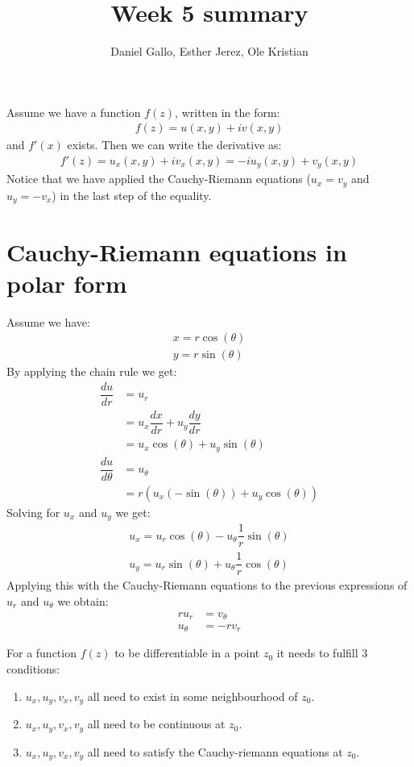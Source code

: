\documentclass{report}
\title{Week 5 summary}
\author{Daniel Gallo, Esther Jerez, Ole Kristian}
\begin{document}
    \maketitle
    \noindent
    Assume we have a function $f(z)$, written in the form:
    \begin{align*}
        f(z) = u(x,y) + iv(x,y)
    \end{align*}
    and $f'(x)$ exists. Then we can write the derivative as:
    \begin{align*}
        f'(z) = u_x(x,y) + iv_x(x,y) = -iu_y(x,y) + v_y(x,y)
    \end{align*}
    Notice that we have applied the Cauchy-Riemann equations ($u_x = v_y$ and $u_y = -v_x$) in the last step of the equality.
    
    \section*{Cauchy-Riemann equations in polar form}
    Assume we have:
    \begin{align*}
        x = r\cos(\theta) \\
        y = r\sin(\theta)
    \end{align*}
    By applying the chain rule we get:
    \begin{align*}
        \dfrac{du}{dr} &= u_r \\ &= u_x\dfrac{dx}{dr} + u_y\dfrac{dy}{dr} \\ &= u_x\cos(\theta)+u_y\sin(\theta) \\
        \dfrac{du}{d\theta} &= u_\theta \\ &= r(u_x(-\sin(\theta)) + u_y\cos(\theta))
    \end{align*}
    Solving for $u_x$ and $u_y$ we get:
    \begin{align*}
        u_x = u_r\cos(\theta) - u_\theta\dfrac{1}{r}\sin(\theta) \\
        u_y = u_r\sin(\theta) + u_\theta\dfrac{1}{r}\cos(\theta)
    \end{align*}
    Applying this with the Cauchy-Riemann equations to the previous expressions of $u_r$ and $u_\theta$ we obtain:
    \begin{align*}
        ru_r &= v_\theta \\ u_\theta &= -rv_r
    \end{align*}
    \begin{tcolorbox}[title=Theorem]
        For a function $f(z)$ to be differentiable in a point $z_0$ it needs to fulfill 3 conditions:
        \begin{enumerate}
            \item $u_x, u_y, v_x, v_y$ all need to exist in some neighbourhood of $z_0$.
            \item $u_x, u_y, v_x, v_y$ all need to be continuous at $z_0$.
            \item $u_x, u_y, v_x, v_y$ all need to satisfy the Cauchy-riemann equations at $z_0$.
        \end{enumerate}
    \end{tcolorbox}
\end{document}
